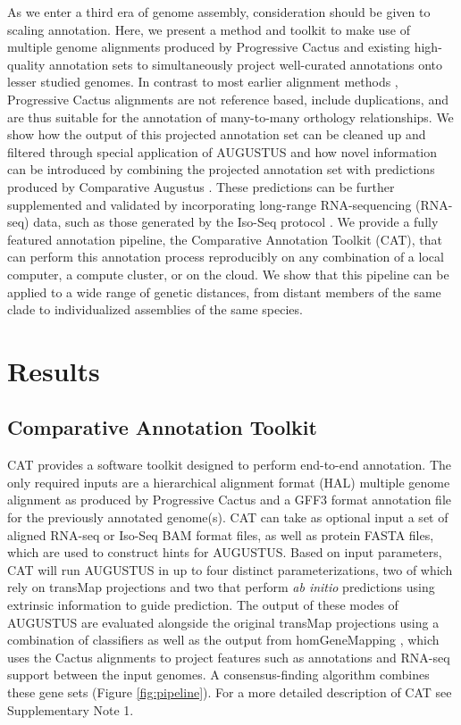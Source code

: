 \documentclass[fleqn,10pt]{wlscirep}
\begin{document}
As we enter a third era of genome assembly, consideration should be given to scaling annotation. Here, we present a method and toolkit to make use of multiple genome alignments produced by Progressive Cactus \cite{paten2011cactus} and existing high-quality annotation sets 
 to simultaneously project well-curated annotations onto lesser studied genomes. 
In contrast to most earlier alignment methods \cite{blanchette2004aligning,earl2014alignathon,miller200728}, Progressive Cactus alignments are not reference based, include duplications, and are thus suitable for the annotation of many-to-many orthology relationships. We show how the output of this projected annotation set can be cleaned up and filtered through special application of AUGUSTUS \cite{stanke2008using} and how novel information can be introduced by combining the projected annotation set with predictions produced by Comparative Augustus \cite{konig2015simultaneous}. These predictions can be further supplemented and validated by incorporating long-range RNA-sequencing (RNA-seq) data, such as those generated by the Iso-Seq protocol \cite{gordon2015widespread}. We provide a fully featured annotation pipeline, the Comparative Annotation Toolkit (CAT), that can perform this annotation process reproducibly on any combination of a local computer, a compute cluster, or on the cloud. We show that this pipeline can be applied to a wide range of genetic distances, from distant members of the same clade to individualized assemblies of the same species.


\section*{Results}

\subsection*{Comparative Annotation Toolkit}

CAT provides a software toolkit designed to perform end-to-end annotation. The only required inputs are a hierarchical alignment format (HAL) \cite{hickey2013hal} multiple genome alignment as produced by Progressive Cactus and a GFF3 format annotation file for the previously annotated genome(s). CAT can take as optional input a set of aligned RNA-seq or Iso-Seq BAM format files, as well as protein FASTA files, which are used to construct hints for AUGUSTUS. Based on input parameters, CAT will run AUGUSTUS in up to four distinct parameterizations, two of which rely on transMap projections and two that perform \textit{ab initio} predictions using extrinsic information to guide prediction. The output of these modes of AUGUSTUS are evaluated alongside the original transMap projections using a combination of classifiers as well as the output from homGeneMapping \cite{stanke2004augustus}, which uses the Cactus alignments to project features such as annotations and RNA-seq support between the input genomes. A consensus-finding algorithm combines these gene sets (Figure \ref{fig:pipeline}). For a more detailed description of CAT see Supplementary Note 1.
\end{document}
